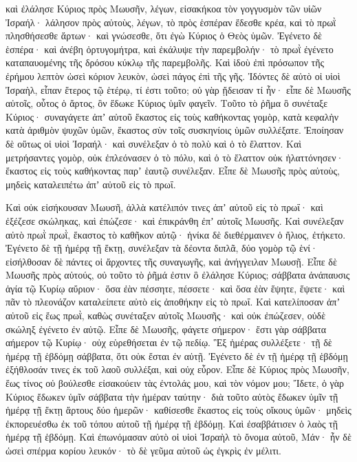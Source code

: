 {καὶ ἐλάλησε Κύριος πρὸς Μωυσῆν, λέγων,
εἰσακήκοα τὸν γογγυσμὸν τῶν υἱῶν Ἰσραήλ· λάλησον πρὸς αὐτοὺς, λέγων, τὸ πρὸς ἑσπέραν ἔδεσθε κρέα, καὶ τὸ πρωῒ πλησθήσεσθε ἄρτων· καὶ γνώσεσθε, ὅτι ἐγὼ Κύριος ὁ Θεὸς ὑμῶν.
Ἐγένετο δὲ ἑσπέρα· καὶ ἀνέβη ὀρτυγομήτρα, καὶ ἐκάλυψε τὴν παρεμβολήν· τὸ πρωῒ ἐγένετο καταπαυομένης τῆς δρόσου κύκλῳ τῆς παρεμβολῆς.
Καὶ ἰδοὺ ἐπὶ πρόσωπον τῆς ἐρήμου λεπτὸν ὡσεὶ κόριον λευκὸν, ὡσεὶ πάγος ἐπὶ τῆς γῆς.
Ἰδόντες δὲ αὐτὸ οἱ υἱοὶ Ἰσραὴλ, εἶπαν ἕτερος τῷ ἑτέρῳ, τί ἐστι τοῦτο; οὐ γὰρ ᾔδεισαν τί ἦν· εἶπε δὲ Μωυσῆς αὐτοῖς, οὗτος ὁ ἄρτος, ὃν ἔδωκε Κύριος ὑμῖν φαγεῖν.
Τοῦτο τὸ ῥῆμα ὃ συνέταξε Κύριος· συναγάγετε ἀπʼ αὐτοῦ ἕκαστος εἰς τοὺς καθήκοντας γομὸρ, κατὰ κεφαλὴν κατὰ ἀριθμὸν ψυχῶν ὑμῶν, ἕκαστος σὺν τοῖς συσκηνίοις ὑμῶν συλλέξατε.
Ἐποίησαν δὲ οὕτως οἱ υἱοὶ Ἰσραήλ· καὶ συνέλεξαν ὁ τὸ πολὺ καὶ ὁ τὸ ἔλαττον.
Καὶ μετρήσαντες γομὸρ, οὐκ ἐπλεόνασεν ὁ τὸ πόλυ, καὶ ὁ τὸ ἔλαττον οὐκ ἠλαττόνησεν· ἕκαστος εἰς τοὺς καθήκοντας παρʼ ἑαυτῷ συνέλεξαν.
Εἶπε δὲ Μωυσῆς πρὸς αὐτοὺς, μηδεὶς καταλειπέτω ἀπʼ αὐτοῦ εἰς τὸ πρωΐ.
\par }{\PP {}Καὶ οὐκ εἰσήκουσαν Μωυσῆ, ἀλλὰ κατέλιπόν τινες ἀπʼ αὐτοῦ εἰς τὸ πρωΐ· καὶ ἐξέζεσε σκώληκας, καὶ ἐπώζεσε· καὶ ἐπικράνθη ἐπʼ αὐτοῖς Μωυσῆς.
Καὶ συνέλεξαν αὐτὸ πρωῒ πρωῒ, ἕκαστος τὸ καθῆκον αὐτῷ· ἡνίκα δὲ διεθέρμαινεν ὁ ἥλιος, ἐτήκετο.
Ἐγένετο δὲ τῇ ἡμέρᾳ τῇ ἕκτῃ, συνέλεξαν τὰ δέοντα διπλᾶ, δύο γομὸρ τῷ ἑνί· εἰσήλθοσαν δὲ πάντες οἱ ἄρχοντες τῆς συναγωγῆς, καὶ ἀνήγγειλαν Μωυσῇ.
Εἶπε δὲ Μωυσῆς πρὸς αὐτούς, οὐ τοῦτο τὸ ῥῆμά ἐστιν ὃ ἐλάλησε Κύριος; σάββατα ἀνάπαυσις ἁγία τῷ Κυρίῳ αὔριον· ὅσα ἐὰν πέσσητε, πέσσετε· καὶ ὅσα ἐὰν ἕψητε, ἕψετε· καὶ πᾶν τὸ πλεονάζον καταλείπετε αὐτὸ εἰς ἀποθήκην εἰς τὸ πρωΐ.
Καὶ κατελίποσαν ἀπʼ αὐτοῦ εἰς ἕως πρωῒ, καθὼς συνέταξεν αὐτοῖς Μωυσῆς· καὶ οὐκ ἐπώζεσεν, οὐδὲ σκώληξ ἐγένετο ἐν αὐτῷ.
Εἶπε δὲ Μωυσῆς, φάγετε σήμερον· ἔστι γὰρ σάββατα αήμερον τῷ Κυρίῳ· οὐχ εὑρεθήσεται ἐν τῷ πεδίῳ.
Ἓξ ἡμέρας συλλέξετε· τῇ δὲ ἡμέρᾳ τῇ ἑβδόμῃ σάββατα, ὅτι οὐκ ἔσται ἐν αὐτῇ.
Ἐγένετο δὲ ἐν τῇ ἡμέρᾳ τῇ ἑβδόμῃ ἐξήθλοσάν τινες ἐκ τοῦ λαοῦ συλλέξαι, καὶ οὐχ εὗρον.
Εἶπε δὲ Κύριος πρὸς Μωυσῆν, ἕως τίνος οὐ βούλεσθε εἰσακούειν τὰς ἐντολάς μου, καὶ τὸν νόμον μου;
Ἴδετε, ὁ γὰρ Κύριος ἔδωκεν ὑμῖν σάββατα τὴν ἡμέραν ταύτην· διὰ τοῦτο αὐτὸς ἔδωκεν ὑμῖν τῇ ἡμέρᾳ τῇ ἕκτῃ ἄρτους δύο ἡμερῶν· καθίσεσθε ἕκαστος εἰς τοὺς οἴκους ὑμῶν· μηδεὶς ἐκπορευέσθω ἐκ τοῦ τόπου αὐτοῦ τῇ ἡμέρᾳ τῇ ἑβδόμῃ.
Καὶ ἐσαββάτισεν ὁ λαὸς τῇ ἡμέρᾳ τῇ ἑβδόμῃ.
Καὶ ἐπωνόμασαν αὐτὸ οἱ υἱοὶ Ἰσραὴλ τὸ ὄνομα αὐτοῦ, Μάν· ἦν δὲ ὡσεὶ σπέρμα κορίου λευκόν· τὸ δὲ γεῦμα αὐτοῦ ὡς ἐγκρὶς ἐν μέλιτι.
}
